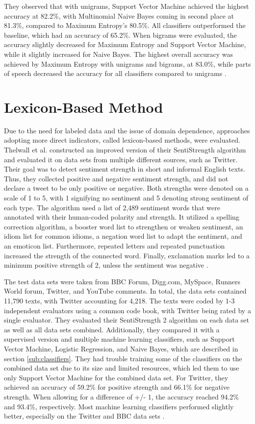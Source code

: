 They observed that with unigrams, Support Vector Machine achieved the highest accuracy at 82.2\%, with Multinomial Naive Bayes coming in second place at 81.3\%, compared to Maximum Entropy's 80.5\%. All classifiers outperformed the baseline, which had an accuracy of 65.2\%. When bigrams were evaluated, the accuracy slightly decreased for Maximum Entropy and Support Vector Machine, while it slightly increased for Naive Bayes. The highest overall accuracy was achieved by Maximum Entropy with unigrams and bigrams, at 83.0\%, while parts of speech decreased the accuracy for all classifiers compared to unigrams \cite{GoBHaHua2009}. 

\section{Lexicon-Based Method}
\label{sub:related_lexicon}

Due to the need for labeled data and the issue of domain dependence, approaches adopting more direct indicators, called lexicon-based methods, were evaluated. Thelwall et al. constructed an improved version of their SentiStrength algorithm and evaluated it on data sets from multiple different sources, such as Twitter. Their goal was to detect sentiment strength in short and informal English texts. Thus, they collected positive and negative sentiment strength, and did not declare a tweet to be only positive or negative. Both strengths were denoted on a scale of 1 to 5, with 1 signifying no sentiment and 5 denoting strong sentiment of each type. The algorithm used a list of 2,489 sentiment words that were annotated with their human-coded polarity and strength. It utilized a spelling correction algorithm, a booster word list to strengthen or weaken sentiment, an idiom list for common idioms, a negation word list to adapt the sentiment, and an emoticon list. Furthermore, repeated letters and repeated punctuation increased the strength of the connected word. Finally, exclamation marks led to a minimum positive strength of 2, unless the sentiment was negative \cite{10.1002/asi.21662}.

The test data sets were taken from BBC Forum, Digg.com, MySpace, Runners World forum, Twitter, and YouTube comments. In total, the data sets contained 11,790 texts, with Twitter accounting for 4,218. The texts were coded by 1-3 independent evaluators using a common code book, with Twitter being rated by a single evaluator. They evaluated their SentiStrength 2 algorithm on each data set as well as all data sets combined. Additionally, they compared it with a supervised version and multiple machine learning classifiers, such as Support Vector Machine, Logistic Regression, and Naive Bayes, which are described in section \ref{sub:classifiers}. They had trouble training some of the classifiers on the combined data set due to its size and limited resources, which led them to use only Support Vector Machine for the combined data set. For Twitter, they achieved an accuracy of 59.2\% for positive strength and 66.1\% for negative strength. When allowing for a difference of +/- 1, the accuracy reached 94.2\% and 93.4\%, respectively. Most machine learning classifiers performed slightly better, especially on the Twitter and BBC data sets \cite{10.1002/asi.21662}.

